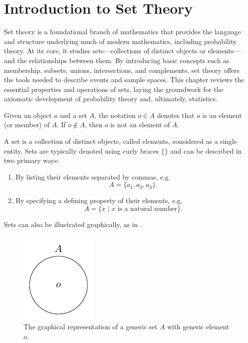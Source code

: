\chapter{Introduction to Set Theory}
\label{chp:set_theory}
Set theory is a foundational branch of mathematics that provides the language and structure underlying much of modern mathematics, including probability theory. At its core, it studies sets---collections of distinct objects or elements---and the relationships between them. By introducing basic concepts such as membership, subsets, unions, intersections, and complements, set theory offers the tools needed to describe events and sample spaces. This chapter reviews the essential properties and operations of sets, laying the groundwork for the axiomatic development of probability theory and, ultimately, statistics.

\begin{definition}[Membership]
	\label{def:membership}
	Given an object $o$ and a set $A$, the notation $o \in A$ denotes that $o$ is an element (or member) of $A$. If $o \notin A$, then $o$ is not an element of $A$.
\end{definition}

\begin{definition}[Set]
	\label{def:set}
	A set is a collection of distinct objects, called elements, considered as a single entity. Sets are typically denoted using curly braces $\{\}$ and can be described in two primary ways:
	\begin{enumerate}
		\item By listing their elements separated by commas, e.g.
		\begin{equation}
			A = \{a_1, a_2, a_3\}.
		\end{equation}
		\item By specifying a defining property of their elements, e.g.
		\begin{equation}
			A = \{x \mid x \text{ is a natural number}\}.
		\end{equation}
	\end{enumerate}
	Sets can also be illustrated graphically, as in .
	\begin{figure}[H]
		\centering
		\includegraphics[]{figures/generic_set.pdf}
		\caption{The graphical representation of a generic set $A$ with generic element $o$.}
		\label{fig:generic_set}
	\end{figure}
\end{definition}

